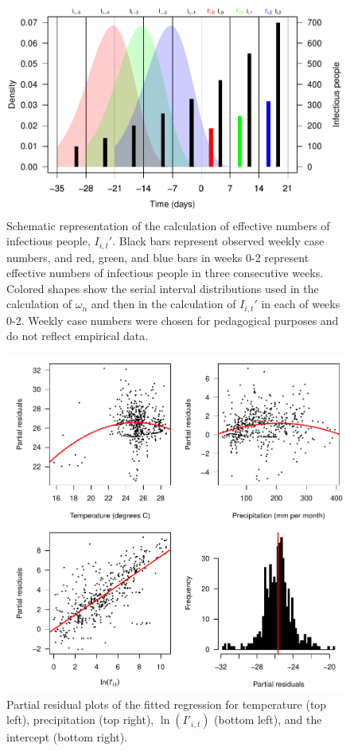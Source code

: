 \documentclass[11pt]{article}
\begin{document}
\begin{figure}[!ht]
\begin{center}
\includegraphics{../output/serialinterval.pdf}
\end{center}
\caption{
Schematic representation of the calculation of effective numbers of infectious people, $I_{i,t}'$. Black bars represent observed weekly case numbers, and red, green, and blue bars in weeks 0-2 represent effective numbers of infectious people in three consecutive weeks. Colored shapes show the serial interval distributions used in the calculation of $\omega_n$ and then in the calculation of $I_{i,t}'$ in each of weeks 0-2. Weekly case numbers were chosen for pedagogical purposes and do not reflect empirical data.
}
\end{figure}


\newpage
\begin{figure}[!ht]
\begin{center}
\includegraphics{../output/partial_residuals.pdf}
\end{center}
\caption{
Partial residual plots of the fitted regression for temperature (top left), precipitation (top right), $\ln(I'_{i,t})$ (bottom left), and the intercept (bottom right).
}
\end{figure}
\end{document}
